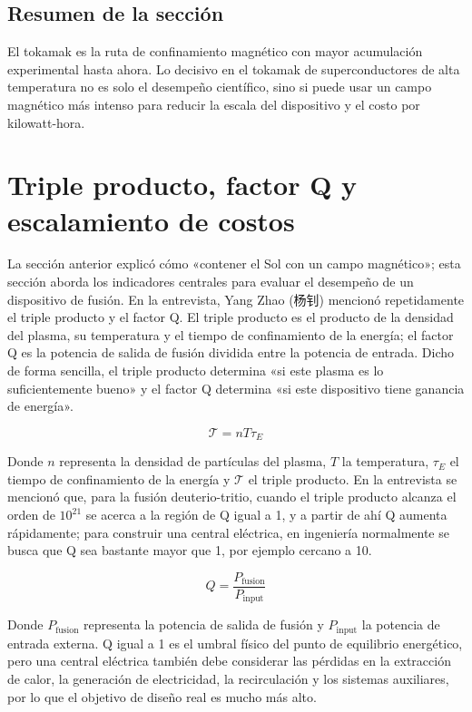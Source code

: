 \documentclass[a4paper]{article}
\begin{document}
\subsection{Resumen de la sección}

El tokamak es la ruta de confinamiento magnético con mayor acumulación experimental hasta ahora. Lo decisivo en el tokamak de superconductores de alta temperatura no es solo el desempeño científico, sino si puede usar un campo magnético más intenso para reducir la escala del dispositivo y el costo por kilowatt-hora.
\section{Triple producto, factor Q y escalamiento de costos}

La sección anterior explicó cómo «contener el Sol con un campo magnético»; esta sección aborda los indicadores centrales para evaluar el desempeño de un dispositivo de fusión. En la entrevista, Yang Zhao (杨钊) mencionó repetidamente el triple producto y el factor Q. El triple producto es el producto de la densidad del plasma, su temperatura y el tiempo de confinamiento de la energía; el factor Q es la potencia de salida de fusión dividida entre la potencia de entrada. Dicho de forma sencilla, el triple producto determina «si este plasma es lo suficientemente bueno» y el factor Q determina «si este dispositivo tiene ganancia de energía».

\[
\mathcal{T}=n T \tau_E
\]

Donde $n$ representa la densidad de partículas del plasma, $T$ la temperatura, $\tau_E$ el tiempo de confinamiento de la energía y $\mathcal{T}$ el triple producto. En la entrevista se mencionó que, para la fusión deuterio-tritio, cuando el triple producto alcanza el orden de $10^{21}$ se acerca a la región de Q igual a 1, y a partir de ahí Q aumenta rápidamente; para construir una central eléctrica, en ingeniería normalmente se busca que Q sea bastante mayor que 1, por ejemplo cercano a 10.

\[
Q=\frac{P_{\mathrm{fusion}}}{P_{\mathrm{input}}}
\]

Donde $P_{\mathrm{fusion}}$ representa la potencia de salida de fusión y $P_{\mathrm{input}}$ la potencia de entrada externa. Q igual a 1 es el umbral físico del punto de equilibrio energético, pero una central eléctrica también debe considerar las pérdidas en la extracción de calor, la generación de electricidad, la recirculación y los sistemas auxiliares, por lo que el objetivo de diseño real es mucho más alto.
\end{document}
